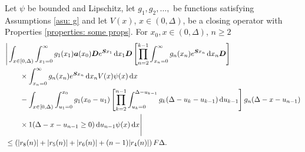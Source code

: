 \begin{cor}
	Let \(\psi\) be bounded and Lipschitz, let \(g_1,g_2,\dots,\) be functions satisfying Assumptions \ref{asu: g} and let \(V(x)\), \(x\in(0,\Delta)\), be a closing operator with Properties \ref{properties: some props}. For \(x_0,x\in(0,\Delta)\), \(n\geq 2\)
	\begin{align}
		&\Bigg| \int_{x\in[0,\Delta)} \int_{x_1=0}^\infty g_1(x_1) \boldsymbol a (x_0) \boldsymbol D e^{\boldsymbol{S}x_1}\, \mathrm{d} x_1\boldsymbol D 
            	\left[\prod_{n=2}^{k-1}\int_{x_n=0}^\infty g_n(x_n) e^{\boldsymbol{S}x_n} \, \mathrm{d} x_n
		\boldsymbol D\right] \nonumber 
            	\\&\qquad{}\times\int_{x_n=0}^\infty g_{n}(x_n) e^{\boldsymbol{S}x_n} \, \mathrm{d} x_n V(x) \psi(x)\, \mathrm{d} x \nonumber 
		\\&\qquad {}- \int_{x\in[0,\Delta)} \int_{u_1=0}^{x_0}g_1(x_0 - u_1)
		\left[\prod_{k=2}^{n-1} \int_{u_k=0}^{\Delta-u_{k-1}} g_k(\Delta-u_k-u_{k-1})\, \mathrm{d} u_{k-1}\right] \nonumber 
            	g_{n}(\Delta - x-u_{n-1})
	\\&\qquad{} \times1(\Delta-x-u_{n-1}\geq0)\, \mathrm{d} u_{n-1}\psi(x)\, \mathrm{d} x \Bigg| \nonumber
		\\&\leq \left(|r_8(n)|+|r_5(n)|+|r_6(n)| + (n-1)|r_4(n)|\right)F\Delta.\label{eqn: KAFnnmna}
	\end{align}
\end{cor}
